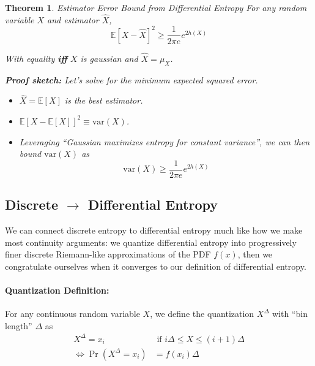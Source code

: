 \documentclass[a4paper,12pt]{report}
\newtheorem{theorem}{Theorem}
\begin{document}
\begin{theorem}{Estimator Error Bound from Differential Entropy}
For any random variable $X$ and estimator $\hat X$, 
\begin{equation}
	\mathbb E\left[ X - \hat X \right]^2 \geq \frac{1}{2\pi e} e^{2 h(X)}
\end{equation}

With equality \textbf{iff} $X$ is gaussian and $\hat X = \mu_X$.

\textbf{Proof sketch:} Let's solve for the minimum expected squared error.
\begin{itemize}
\item $\hat X = \mathbb E[X]$ is the best estimator.
\item $\mathbb E \left[ X - \mathbb E[X] \right]^2 \equiv \text{var}(X)$.
\item Leveraging ``Gaussian maximizes entropy for constant variance'', we can
then bound $\text{var}(X)$ as
\begin{equation}
	\text{var}(X) \geq \frac{1}{2\pi e} e^{2h(X)}
\end{equation}
\end{itemize}
\qedsymbol{}
\end{theorem}












\subsection{Discrete $\to$ Differential Entropy}

We can connect discrete entropy to differential entropy much like how we make
most continuity arguments: we quantize differential entropy into progressively
finer discrete Riemann-like approximations of the PDF $f(x)$, then we
congratulate ourselves when it converges to our definition of differential
entropy.

\paragraph{Quantization Definition: } For any continuous random variable $X$, we
define the quantization $X^\Delta$ with ``bin length'' $\Delta$ as 
\begin{align}
	X^\Delta = x_i &\text{ if } i \Delta \leq X \leq (i+1)\Delta \\
	\iff \Pr(X^\Delta = x_i) &= f(x_i) \Delta 
\end{align}
\end{document}
